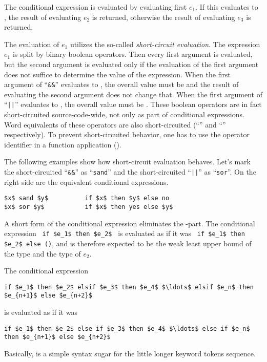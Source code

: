 The conditional expression is evaluated by evaluating first $e_1$. If this evaluates to , the result of evaluating $e_2$ is returned, otherwise the result of evaluating $e_3$ is returned. 

The evaluation of $e_1$ utilizes the so-called {\em short-circuit evaluation}. The expression $e_1$ is split by binary boolean operators. Then every first argument is evaluated, but the second argument is evaluated only if the evaluation of the first argument does not suffice to determine the value of the expression. When the first argument of ``\lstinline!&&!'' evaluates to , the overall value must be  and the result of evaluating the second argument does not change that. When the first argument of ``\lstinline!||!'' evaluates to , the overall value must be . These boolean operators are in fact short-circuited source-code-wide, not only as part of conditional expressions. Word equivalents of these operators are also short-circuited (``'' and ``'' respectively). To prevent short-circuited behavior, one has to use the operator identifier in a function application ().

\example The following examples show how short-circuit evaluation behaves. Let's mark the short-circuited ``\lstinline!&&!'' as ``\lstinline!sand!'' and the short-circuited ``\lstinline!||!'' as ``\lstinline!sor!''. On the right side are the equivalent conditional expressions. 
\begin{lstlisting}
$x$ sand $y$          if $x$ then $y$ else no
$x$ sor $y$           if $x$ then yes else $y$
\end{lstlisting}

A short form of the conditional expression eliminates the -part. The conditional expression ~\lstinline!if $e_1$ then $e_2$!~ is evaluated as if it was ~\lstinline!if $e_1$ then $e_2$ else ()!, and is therefore expected to be the weak least upper bound of the type  and the type of $e_2$. 

The conditional expression 
\begin{lstlisting}
if $e_1$ then $e_2$ elsif $e_3$ then $e_4$ $\ldots$ elsif $e_n$ then $e_{n+1}$ else $e_{n+2}$
\end{lstlisting} 
is evaluated as if it was 
\begin{lstlisting}
if $e_1$ then $e_2$ else if $e_3$ then $e_4$ $\ldots$ else if $e_n$ then $e_{n+1}$ else $e_{n+2}$
\end{lstlisting}
Basically,  is a simple syntax sugar for the little longer  keyword tokens sequence. 

